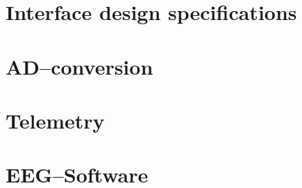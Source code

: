 \section{Interface design specifications}
\section{A\/D--conversion}
\section{Telemetry}
\section{EEG--Software}
